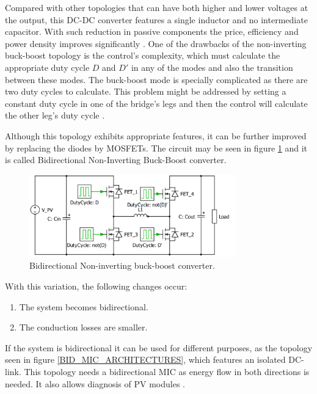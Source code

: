 Compared with other topologies that can have both higher and lower voltages at the output, this DC-DC converter features a single inductor and no intermediate capacitor. With such reduction in passive components the price, efficiency and power density improves significantly \cite{underthehood}. One of the drawbacks of the non-inverting buck-boost topology is the control's complexity, which must calculate the appropriate duty cycle $D$ and $D'$ in any of the modes and also the transition between these modes. The buck-boost mode is specially complicated as there are two duty cycles to calculate. This problem might be addressed by setting a constant duty cycle in one of the bridge's legs and then the control will calculate the other leg's duty cycle  \cite{AN4449_ST}.
		
Although this topology exhibits appropriate features, it can be further improved by replacing the diodes by MOSFETs. The circuit may be seen in figure \ref{BID_N_INV_BB_SCHEMATIC} and it is called Bidirectional Non-Inverting Buck-Boost converter.

\begin{figure}[H]
	\begin{center}
		\includegraphics[width=0.8\textwidth]{../Pictures/BID_H_B_BB}
		\caption{Bidirectional Non-inverting buck-boost converter.}
		\label{BID_N_INV_BB_SCHEMATIC}
	\end{center}
\end{figure}

With this variation, the following changes occur:
		
\begin{enumerate}
	\item The system becomes bidirectional.
	\item The conduction losses are smaller. 
\end{enumerate}

If the system is bidirectional it can be used for different purposes, as the topology seen in figure \ref{BID_MIC_ARCHITECTURES}, which features an isolated DC-link. This topology needs a bidirectional MIC as energy flow in both directions is needed. It also allows diagnosis of PV modules .

